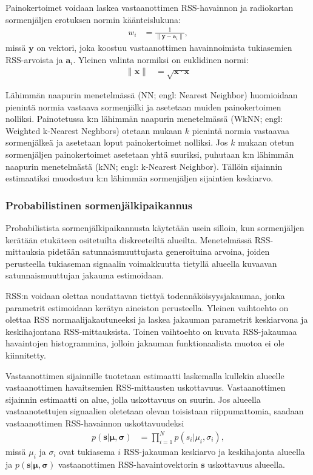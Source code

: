 Painokertoimet voidaan laskea vastaanottimen RSS-havainnon ja radiokartan
sormenjäljen erotuksen normin käänteislukuna:
\begin{align}
  w_i &= \frac{1}{\| \mathbf{y} - \mathbf{a}_i \|},
\end{align}
missä $\mathbf{y}$ on vektori, joka koostuu vastaanottimen havainnoimista
tukiasemien RSS-arvoista ja $\mathbf{a}_i$. Yleinen valinta normiksi on
euklidinen normi:
\begin{align}
  \| \mathbf{x} \| &= \sqrt{\mathbf{x} \cdot \mathbf{x}}
\end{align}

Lähimmän naapurin menetelmässä (NN; engl: Nearest Neighbor) huomioidaan
pienintä normia vastaava sormenjälki ja asetetaan muiden painokertoimen
nolliksi. Painotetussa k:n lähimmän naapurin menetelmässä (WkNN; engl: Weighted
k-Nearest Neghbors) otetaan mukaan $k$ pienintä normia vastaavaa sormenjälkeä
ja asetetaan loput painokertoimet nolliksi. Jos $k$ mukaan otetun sormenjäljen
painokertoimet asetetaan yhtä suuriksi, puhutaan k:n lähimmän naapurin
menetelmästä (kNN; engl: k-Nearest Neighbor).  Tällöin sijainnin estimaatiksi
muodostuu k:n lähimmän sormenjäljen sijaintien keskiarvo.

\subsubsection{Probabilistinen sormenjälkipaikannus}

Probabilistista sormenjälkipaikannusta käytetään usein silloin, kun
sormenjäljen kerätään etukäteen ositetuilta diskreeteiltä alueilta.
Menetelmässä RSS-mittauksia pidetään satunnaismuuttujasta generoituina arvoina,
joiden perusteella tukiaseman signaalin voimakkuutta tietyllä alueella kuvaavan
satunnaismuuttujan jakauma estimoidaan.

RSS:n voidaan olettaa noudattavan tiettyä todennäköisyysjakaumaa, jonka
parametrit estimoidaan kerätyn aineiston perusteella. Yleinen vaihtoehto on
olettaa RSS normaalijakautuneeksi ja laskea jakauman parametrit keskiarvona ja
keskihajontana RSS-mittauksista. Toinen vaihtoehto on kuvata RSS-jakaumaa
havaintojen histogrammina, jolloin jakauman funktionaalista muotoa ei ole
kiinnitetty.

Vastaanottimen sijainnille tuotetaan estimaatti laskemalla kullekin alueelle
vastaanottimen havaitsemien RSS-mittausten uskottavuus. Vastaanottimen
sijainnin estimaatti on alue, jolla uskottavuus on suurin. Jos alueella
vastaanotettujen signaalien oletetaan olevan toisistaan riippumattomia, saadaan
vastaanottimen RSS-havainnon uskottavuudeksi
\begin{align}
  p(\mathbf{s} | \mathbf{\mu},\mathbf{\sigma}) &=
  \prod_{i=1}^N p(s_i | \mu_i, \sigma_i),
\end{align}
missä $\mu_i$ ja $\sigma_i$ ovat tukiasema $i$ RSS-jakauman keskiarvo ja
keskihajonta alueella ja $p(\mathbf{s}|\mathbf{\mu},\mathbf{\sigma})$
vastaanottimen RSS-havaintovektorin $\mathbf{s}$ uskottavuus alueella.

